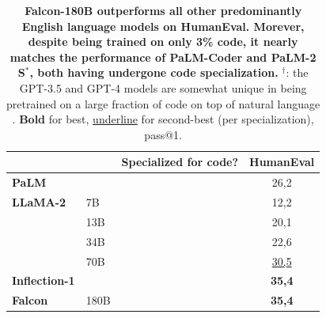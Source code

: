 \documentclass{article}
\DeclareRobustCommand{\performance}[1]{\textcolor{JungleGreen}{#1}}
\begin{document}
\begin{table}[t]
\caption{\textbf{\performance{Falcon-180B outperforms all other predominantly English language models on HumanEval. Morever, despite being trained on only 3\% code, it nearly matches the performance of PaLM-Coder and PaLM-2 S$^*$, both having undergone code specialization.}} $^\dagger$: the GPT-3.5 and GPT-4 models are somewhat unique in being pretrained on a large fraction of code on top of natural language \citep{openai_modelindex}. \textbf{Bold} for best, \underline{underline} for second-best (per specialization), pass@1.}
\label{tab:code}
\centering
\vspace{0.1in}
\begin{tabular}{llcc}
\toprule
                           &             & \textbf{Specialized for code?} & \textbf{HumanEval} \\ \midrule
\textbf{PaLM}              &             &                                & 26,2               \\ 
\textbf{LLaMA-2}           & 7B          &                                & 12,2               \\
\textbf{}                  & 13B         &                                & 20,1               \\
\textbf{}                  & 34B         &                                & 22,6               \\
\textbf{}                  & 70B         &                                & \underline{30,5}               \\
\textbf{Inflection-1}            &        &                                & \textbf{35,4}               \\
\textbf{Falcon}            & 180B        &                                & \textbf{35,4}               \\ \midrule


\end{tabular}
\end{table}
\end{document}
